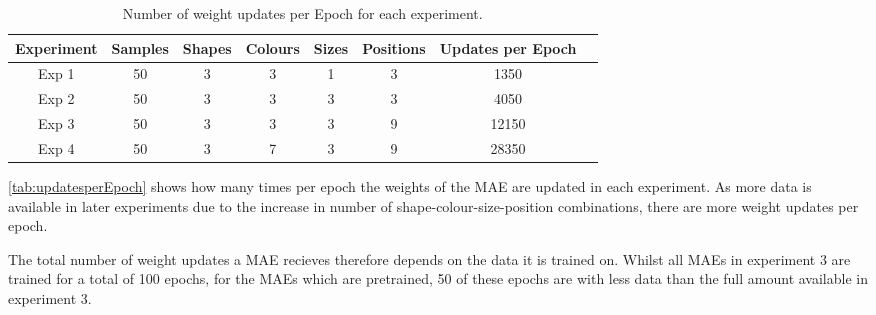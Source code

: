 \begin{table}
\centering
\begin{tabular}{|c|c|c|c|c|c|c|c|}
\hline
Experiment & Samples & Shapes & Colours & Sizes & Positions & Updates per Epoch \\ \hline
Exp 1 & 50 & 3 & 3 & 1 & 3 & 1350 \\ \hline
Exp 2 & 50 & 3 & 3 & 3 & 3 & 4050 \\ \hline
Exp 3 & 50 & 3 & 3 & 3 & 9 & 12150 \\ \hline
Exp 4 & 50 & 3 & 7 & 3 & 9 & 28350 \\ \hline

\end{tabular}
\caption{Number of weight updates per Epoch for each experiment.}
\label{tab:updatesperEpoch}
\end{table}

\autoref{tab:updatesperEpoch} shows how many times per epoch the weights of the MAE are updated in each experiment. As more data is available in later experiments due to the increase in number of shape-colour-size-position combinations, there are more weight updates per epoch. 

The total number of weight updates a MAE recieves therefore depends on the data it is trained on. Whilst all MAEs in experiment 3 are trained for a total of 100 epochs, for the MAEs which are pretrained, 50 of these epochs are with less data than the full amount available in experiment 3.


